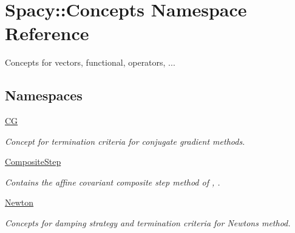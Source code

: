 \hypertarget{namespaceSpacy_1_1Concepts}{}\section{Spacy\+:\+:Concepts Namespace Reference}
\label{namespaceSpacy_1_1Concepts}


Concepts for vectors, functional, operators, ...  


\subsection*{Namespaces}
\begin{DoxyCompactItemize}
\item 
 \hyperlink{namespaceSpacy_1_1Concepts_1_1CG}{C\+G}
\begin{DoxyCompactList}\small\item\em Concept for termination criteria for conjugate gradient methods. \end{DoxyCompactList}\item 
 \hyperlink{namespaceSpacy_1_1Concepts_1_1CompositeStep}{Composite\+Step}
\begin{DoxyCompactList}\small\item\em Contains the affine covariant composite step method of \cite{Lubkoll2015}, \cite{Lubkoll2015a}. \end{DoxyCompactList}\item 
 \hyperlink{namespaceSpacy_1_1Concepts_1_1Newton}{Newton}
\begin{DoxyCompactList}\small\item\em Concepts for damping strategy and termination criteria for Newton\textquotesingle{}s method. \end{DoxyCompactList}\end{DoxyCompactItemize}
